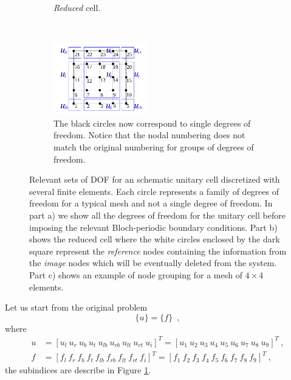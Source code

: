 \begin{figure}[h]
\begin{subfigure}[b]{0.3\textwidth}
		\caption{\emph{Reduced} cell.}
	\end{subfigure}\\
%
	\begin{subfigure}[b]{0.7\textwidth}\qquad
		\centering
		\includegraphics[width=0.45\textwidth]{img/cell_FEM-nodes.pdf}
		\caption{The black circles now correspond to single degrees of freedom. Notice that the nodal numbering does not match the original numbering for groups of degrees of freedom.}
	\end{subfigure}
\caption{Relevant sets of DOF for an schematic unitary cell discretized with several finite elements. Each circle represents a family of degrees of freedom for a typical mesh and not a single degree of freedom. In part a) we show all the degrees of freedom for the unitary cell before imposing the relevant Bloch-periodic boundary conditions. Part b) shows the reduced cell where the white circles enclosed by the dark square represent the \emph{reference} nodes containing the information from the \emph{image} nodes which will be eventually deleted from the system. Part c) shows an example of node grouping for a mesh of $4\times 4$ elements.}
\label{fig:bloch_FEM}
\end{figure}
Let us start from the original problem
\begin{equation}
[K-\omega^2 M]\lbrace u\rbrace = \lbrace f\rbrace \enspace ,
\label{eq:discrete_system}
\end{equation}
where
\begin{align*}
u &= [u_l\ u_r\ u_b\ u_t\ u_{lb}\ u_{rb}\ u_{lt}\ u_{rt}\ u_{i}]^T = [ u_1\ u_2\ u_3\ u_4\ u_5\ u_6\ u_7\ u_8\ u_9]^T\ , \\
f &= [f_l\ f_r\ f_b\ f_t\ f_{lb}\ f_{rb}\ f_{lt}\ f_{rt}\ f_{i}]^T = [ f_1\ f_2\ f_3\ f_4\ f_5\ f_6\ f_7\ f_8\ f_9]^T\ ,
\end{align*}
the subindices are describe in Figure \ref{fig:bloch_FEM}.

